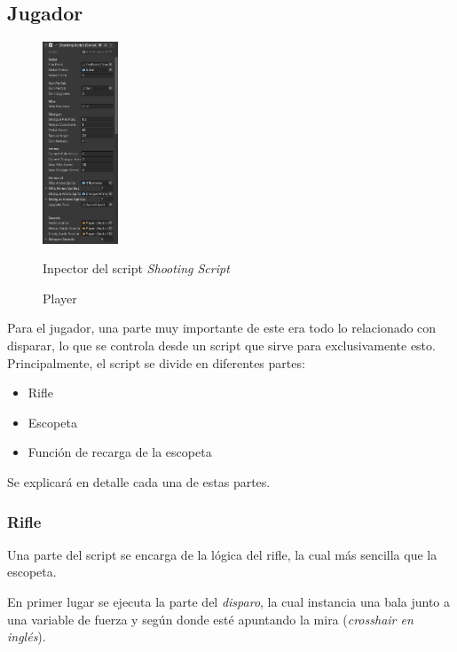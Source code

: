 \documentclass[12pt]{article}
\begin{document}
    \subsection{Jugador}

    \begin{figure}
        \begin{center}
            \includegraphics[width=0.2\textwidth]{Images/ShootyMacShooty/rifleinspector.png}
            \caption*{Inpector del script \textit{Shooting Script}}
        \end{center}
        \caption{Player}
    
    \end{figure}        

        Para el jugador, una parte muy importante de este era todo lo relacionado con disparar, lo que se controla desde un script que sirve para exclusivamente esto. Principalmente, el script se divide en diferentes partes:

        \begin{itemize}
            \item Rifle 
            \item Escopeta
            \item Función de recarga de la escopeta
        \end{itemize}
        Se explicará en detalle cada una de estas partes.\\
        \newpage

        \subsubsection{Rifle} \label{rifle}
            Una parte del script se encarga de la lógica del rifle, la cual más sencilla que la escopeta.

            En primer lugar se ejecuta la parte del \textit{disparo}, la cual instancia una bala junto a una variable de fuerza y según donde esté apuntando la mira (\textit{crosshair en inglés}).\\
\end{document}
